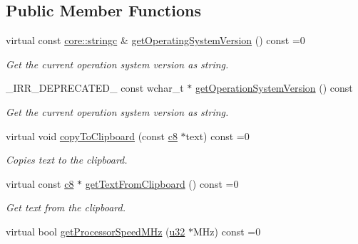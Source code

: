 \subsection*{Public Member Functions}
\begin{DoxyCompactItemize}
\item 
\mbox{\label{classirr_1_1IOSOperator_acf89b7715468ad2af91807dea6d40bf8}} 
virtual const \hyperlink{namespaceirr_1_1core_ab26a0e0359206b5a694f35c37c829d7f}{core\+::stringc} \& \hyperlink{classirr_1_1IOSOperator_acf89b7715468ad2af91807dea6d40bf8}{get\+Operating\+System\+Version} () const =0
\begin{DoxyCompactList}\small\item\em Get the current operation system version as string. \end{DoxyCompactList}\item 
\+\_\+\+I\+R\+R\+\_\+\+D\+E\+P\+R\+E\+C\+A\+T\+E\+D\+\_\+ const wchar\+\_\+t $\ast$ \hyperlink{classirr_1_1IOSOperator_a8d634ee79439742b7397ca7ad7a3812a}{get\+Operation\+System\+Version} () const
\begin{DoxyCompactList}\small\item\em Get the current operation system version as string. \end{DoxyCompactList}\item 
\mbox{\label{classirr_1_1IOSOperator_aba3b621ed3b64e5a421c42b06b49e0b6}} 
virtual void \hyperlink{classirr_1_1IOSOperator_aba3b621ed3b64e5a421c42b06b49e0b6}{copy\+To\+Clipboard} (const \hyperlink{namespaceirr_a9395eaea339bcb546b319e9c96bf7410}{c8} $\ast$text) const =0
\begin{DoxyCompactList}\small\item\em Copies text to the clipboard. \end{DoxyCompactList}\item 
virtual const \hyperlink{namespaceirr_a9395eaea339bcb546b319e9c96bf7410}{c8} $\ast$ \hyperlink{classirr_1_1IOSOperator_a9026ff9f28b48615971e18fcee6fff4c}{get\+Text\+From\+Clipboard} () const =0
\begin{DoxyCompactList}\small\item\em Get text from the clipboard. \end{DoxyCompactList}\item 
virtual bool \hyperlink{classirr_1_1IOSOperator_abc61b8016ec35125ef94adea42209ecd}{get\+Processor\+Speed\+M\+Hz} (\hyperlink{namespaceirr_a0416a53257075833e7002efd0a18e804}{u32} $\ast$M\+Hz) const =0

\end{DoxyCompactItemize}
